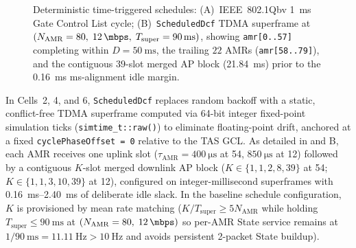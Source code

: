 \documentclass[11pt,a4paper]{article}
\newcommand{\Namr}{\ensuremath{N_{\mathrm{AMR}}}}
\newcommand{\Tsuper}{\ensuremath{T_{\mathrm{super}}}}
\begin{document}
\begin{figure}[!tb]
\caption{Deterministic time-triggered schedules: (A)~IEEE~802.1Qbv \qty{1}{\milli\second} Gate Control List cycle; (B)~\texttt{ScheduledDcf} TDMA superframe at $(\Namr=80,\; \qty{12}{\mbps},\; \Tsuper=\qty{90}{\milli\second})$, showing \texttt{amr[0..57]} completing within $D=\qty{50}{\milli\second}$, the trailing $22$ AMRs (\texttt{amr[58..79]}), and the contiguous $39$-slot merged AP block (\qty{21.84}{\milli\second}) prior to the \qty{0.16}{\milli\second} ms-alignment idle margin.}
\label{fig:timing_diagrams}
\end{figure}

In Cells~2, 4, and 6, \texttt{ScheduledDcf} replaces random backoff with a static, conflict-free TDMA superframe computed via 64-bit integer fixed-point simulation ticks (\texttt{simtime\_t::raw()}) to eliminate floating-point drift, anchored at a fixed \texttt{cyclePhaseOffset = 0} relative to the TAS GCL. As detailed in  and B, each AMR receives one uplink slot ($\tau_{\mathrm{AMR}} = \qty{400}{\micro\second}$ at \qty{54}{\mbps}, $\qty{850}{\micro\second}$ at \qty{12}{\mbps}) followed by a contiguous $K$-slot merged downlink AP block ($K \in \{1, 1, 2, 8, 39\}$ at \qty{54}{\mbps}; $K \in \{1, 1, 3, 10, 39\}$ at \qty{12}{\mbps}), configured on integer-millisecond superframes with \qtyrange{0.16}{2.40}{\milli\second} of deliberate idle slack. In the baseline schedule configuration, $K$ is provisioned by mean rate matching ($K/\Tsuper \ge 5\Namr$ while holding $\Tsuper \le \qty{90}{\milli\second}$ at $(\Namr=80,\; \qty{12}{\mbps})$ so per-AMR State service remains at $1/\qty{90}{\milli\second} = \qty{11.11}{\hertz} > \qty{10}{\hertz}$ and avoids persistent 2-packet State buildup).
\end{document}
